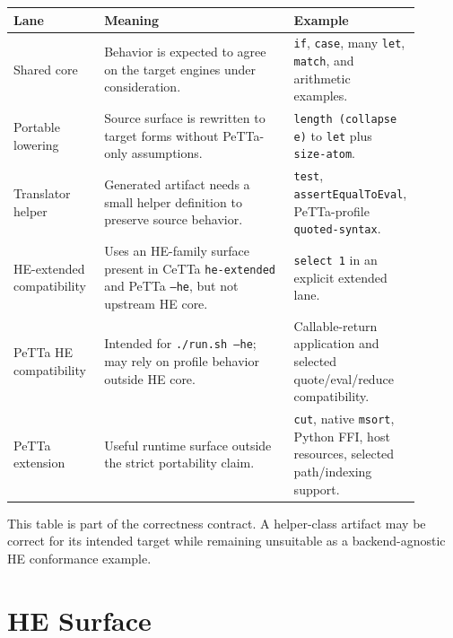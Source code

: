 \documentclass[11pt]{article}
\newcommand{\code}[1]{\texttt{#1}}
\newcommand{\HE}{\textup{HE}}
\newcommand{\PeTTa}{\textup{PeTTa}}
\begin{document}
\begin{longtable}{>{\raggedright\arraybackslash}p{0.22\linewidth}
                  >{\raggedright\arraybackslash}p{0.46\linewidth}
                  >{\raggedright\arraybackslash}p{0.22\linewidth}}
\toprule
Lane & Meaning & Example \\
\midrule
\endhead
Shared core & Behavior is expected to agree on the target engines under
consideration. & \code{if}, \code{case}, many \code{let}, \code{match}, and
arithmetic examples. \\
Portable lowering & Source surface is rewritten to target forms without
\PeTTa{}-only assumptions. & \code{length (collapse e)} to \code{let} plus
\code{size-atom}. \\
Translator helper & Generated artifact needs a small helper definition to
preserve source behavior. & \code{test}, \code{assertEqualToEval},
\PeTTa{}-profile \code{quoted-syntax}. \\
\HE{}-extended compatibility & Uses an \HE{}-family surface present in CeTTa
\code{he-extended} and \PeTTa{} \code{--he}, but not upstream \HE{} core. &
\code{select 1} in an explicit extended lane. \\
\PeTTa{} \HE{} compatibility & Intended for \code{./run.sh --he}; may rely on
profile behavior outside \HE{} core. & Callable-return application and selected
quote/eval/reduce compatibility. \\
\PeTTa{} extension & Useful runtime surface outside the strict portability
claim. & \code{cut}, native \code{msort}, Python FFI, host resources, selected path/indexing support. \\
\bottomrule
\end{longtable}

This table is part of the correctness contract.  A helper-class artifact may be
correct for its intended target while remaining unsuitable as a backend-agnostic
\HE{} conformance example.

\section{\HE{} Surface}
\end{document}
